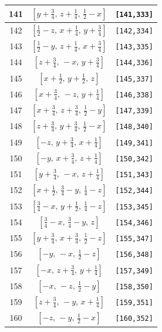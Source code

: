 \documentclass[fleqn,8pt]{jsarticle}
\begin{document}
\begin{longtable}{ccc}
141 & $\left[ y + \frac{3}{4},\, z + \frac{1}{4},\, \frac{1}{2} - x \right]$ & {\tt [141,333]} \\ \hline
142 & $\left[ \frac{1}{2} - z,\, x + \frac{1}{4},\, y + \frac{3}{4} \right]$ & {\tt [142,334]} \\ \hline
143 & $\left[ \frac{1}{2} - y,\, z + \frac{1}{4},\, x + \frac{3}{4} \right]$ & {\tt [143,335]} \\ \hline
144 & $\left[ z + \frac{3}{4},\, - x,\, y + \frac{3}{4} \right]$ & {\tt [144,336]} \\ \hline
145 & $\left[ x + \frac{1}{2},\, y + \frac{1}{2},\, z \right]$ & {\tt [145,337]} \\ \hline
146 & $\left[ x + \frac{3}{4},\, - z,\, y + \frac{1}{4} \right]$ & {\tt [146,338]} \\ \hline
147 & $\left[ x + \frac{3}{4},\, z + \frac{3}{4},\, \frac{1}{2} - y \right]$ & {\tt [147,339]} \\ \hline
148 & $\left[ z + \frac{3}{4},\, y + \frac{3}{4},\, \frac{1}{2} - x \right]$ & {\tt [148,340]} \\ \hline
149 & $\left[ - z,\, y + \frac{3}{4},\, x + \frac{1}{4} \right]$ & {\tt [149,341]} \\ \hline
150 & $\left[ - y,\, x + \frac{3}{4},\, z + \frac{1}{4} \right]$ & {\tt [150,342]} \\ \hline
151 & $\left[ y + \frac{3}{4},\, - x,\, z + \frac{1}{4} \right]$ & {\tt [151,343]} \\ \hline
152 & $\left[ x + \frac{1}{2},\, \frac{3}{4} - y,\, \frac{1}{4} - z \right]$ & {\tt [152,344]} \\ \hline
153 & $\left[ \frac{3}{4} - x,\, y + \frac{1}{2},\, \frac{1}{4} - z \right]$ & {\tt [153,345]} \\ \hline
154 & $\left[ \frac{3}{4} - x,\, \frac{3}{4} - y,\, z \right]$ & {\tt [154,346]} \\ \hline
155 & $\left[ y + \frac{3}{4},\, x + \frac{3}{4},\, \frac{1}{2} - z \right]$ & {\tt [155,347]} \\ \hline
156 & $\left[ - y,\, - x,\, \frac{1}{2} - z \right]$ & {\tt [156,348]} \\ \hline
157 & $\left[ - x,\, z + \frac{3}{4},\, y + \frac{1}{4} \right]$ & {\tt [157,349]} \\ \hline
158 & $\left[ - x,\, - z,\, \frac{1}{2} - y \right]$ & {\tt [158,350]} \\ \hline
159 & $\left[ z + \frac{3}{4},\, - y,\, x + \frac{1}{4} \right]$ & {\tt [159,351]} \\ \hline
160 & $\left[ - z,\, - y,\, \frac{1}{2} - x \right]$ & {\tt [160,352]} \\ \hline

\end{longtable}
\end{document}

